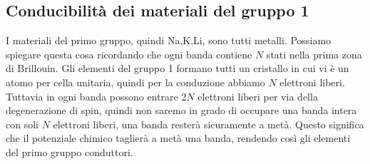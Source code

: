 \subsection{Conducibilità dei materiali del gruppo 1}
\label{subsec:Conducibilità dei materiali del gruppo 1}
I materiali del primo gruppo, quindi Na,K,Li, sono tutti metalli. Possiamo spiegare questa cosa ricordando che ogni banda contiene $N$ stati nella prima zona di Brillouin. Gli elementi del gruppo 1 formano tutti un cristallo in cui vi è un atomo per cella unitaria, quindi per la conduzione abbiamo $N$ elettroni liberi. \\
Tuttavia in ogni banda possono entrare 2$N$ elettroni liberi per via della degenerazione di spin, quindi non saremo in grado di occupare una banda intera con soli $N$ elettroni liberi, una banda resterà sicuramente a metà. Questo significa che il potenziale chimico taglierà a metà una banda, rendendo così gli elementi del primo gruppo conduttori. 
